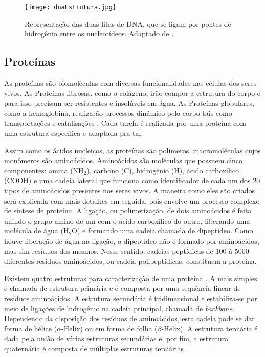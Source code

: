 \begin{figure}[h]
    \centering
    \texttt{[image: dnaEstrutura.jpg]}
    \caption{Representação das duas fitas de DNA, que se ligam por pontes de hidrogênio entre os nucleotídeos. Adaptado de \cite{dnadiscovery08}.}
    \label{fig:EstruturasDoDNA}
\end{figure} 



\subsection{Proteínas} \label{proteinas}

\indent As proteínas são biomoléculas com diversas funcionalidades nas células dos seres vivos. As Proteínas fibrosas, como o colágeno, irão compor a estrutura do corpo e para isso precisam ser resistentes e insolúveis em água. As Proteínas globulares, como a hemoglobina, realizarão processos dinâmico pelo corpo tais como transportações e catalisações \cite{profangela11}. Cada tarefa é realizada por uma proteína com uma estrutura específica e adaptada pra tal.

\indent Assim como os ácidos nucleicos, as proteínas são polímeros, macromoléculas cujos monômeros são aminoácidos. Aminoácidos são moléculas que possuem cinco componentes: amina (NH$_{2}$), carbono (C), hidrogênio (H), ácido carboxílico (COOH) e uma cadeia lateral que funciona como identificador de cada um dos 20 tipos de aminoácidos presentes nos seres vivos. A maneira como eles são criados será explicada com mais detalhes em seguida, pois envolve um processo complexo de síntese de proteína. A ligação, ou polimerização, de dois aminoácidos é feita unindo o grupo amino de um com o ácido carboxílico do outro, liberando uma molécula de água (H$_{2}$O) e formando uma cadeia chamada de dipeptídeo. Como houve liberação de água na ligação, o dipeptídeo não é formado por aminoácidos, mas sim resíduos dos mesmos. Nesse sentido, cadeias peptídicas de 100 à 5000 diferentes resíduos aminoácidos, ou cadeia polipeptídicas,  constituem a proteína.


\indent Existem quatro estruturas para caracterização de uma proteína \cite{setubal97}. A mais simples é chamada de estrutura primária e é composta por uma sequência linear de resíduos aminoácidos. A estrutura secundária é tridimensional e estabiliza-se por meio de ligações de hidrogênio na cadeia principal, chamada de \textit{backbone}. Dependendo da disposição dos resíduos de aminoácidos, esta cadeia pode se dar forma de hélice ($\alpha$-Helix) ou em forma de folha ($\beta$-Helix). A estrutura terciária é dada pela união de várias estruturas secundárias e, por fim, a estrutura quaternária é composta de múltiplas estruturas terciárias \cite{drug09}.

